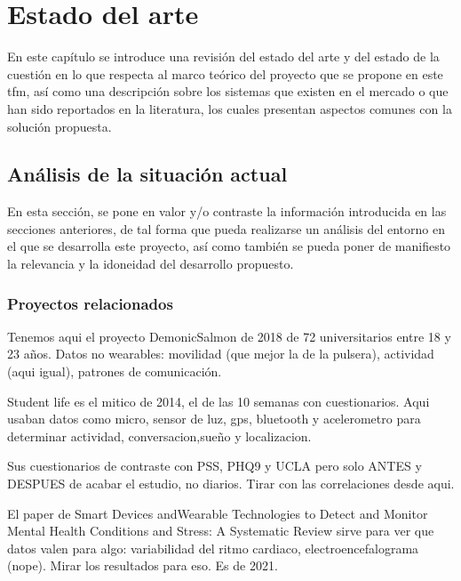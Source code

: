 \chapter{Estado del arte}
\label{chapter:estado_arte}



En este capítulo se introduce una revisión del estado del arte y del estado de la cuestión en lo que respecta al marco teórico del proyecto que se propone en este \gls{tfm}, así como una descripción sobre los sistemas que existen en el mercado o que han sido reportados en la literatura, los cuales presentan aspectos comunes con la solución propuesta.


\section{Análisis de la situación actual}

En esta sección, se pone en valor y/o contraste la información introducida en las secciones anteriores, de tal forma que pueda realizarse un análisis del entorno en el que se desarrolla este proyecto, así como también se pueda poner de manifiesto la relevancia y la idoneidad del desarrollo propuesto. 



\subsection{Proyectos relacionados}

Tenemos aqui el proyecto DemonicSalmon de 2018 de 72 universitarios entre 18 y 23 años. Datos no wearables: movilidad (que mejor la de la pulsera), actividad (aqui igual), patrones de comunicación.

Student life es el mitico de 2014, el de las 10 semanas con cuestionarios. Aqui usaban datos como micro, sensor de luz, gps, bluetooth y acelerometro para determinar actividad, conversacion,sueño y localizacion.

Sus cuestionarios de contraste con PSS, PHQ9 y UCLA pero solo ANTES y DESPUES de acabar el estudio, no diarios. Tirar con las correlaciones desde aqui.

El paper de Smart Devices andWearable Technologies to Detect and
Monitor Mental Health Conditions and Stress:
A Systematic Review sirve para ver que datos valen para algo: variabilidad del ritmo cardiaco,  electroencefalograma (nope). Mirar los resultados para eso. Es de 2021.

